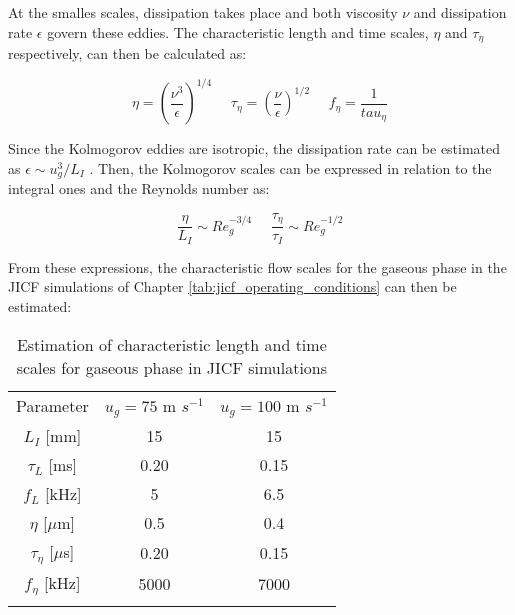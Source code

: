 At the smalles scales, dissipation takes place and both viscosity $\nu$ and dissipation rate $\epsilon$ govern these eddies. The characteristic length and time scales, $\eta$ and $\tau_\eta$ respectively, can then be calculated as:

\begin{equation}
\eta = \left( \frac{\nu^3}{\epsilon} \right)^{1/4} ~~~~~~ \tau_\eta = \left( \frac{\nu}{\epsilon} \right)^{1/2} ~~~~~~ f_\eta = \frac{1}{tau_\eta}
\end{equation}

Since the Kolmogorov eddies are isotropic, the dissipation rate can be estimated as $\epsilon \sim u_g^3/L_I$ . Then, the Kolmogorov scales can be expressed in relation to the integral ones and the Reynolds number as:

\begin{equation}
\frac{\eta}{L_I} \sim Re_g^{-3/4} ~~~~~~ \frac{\tau_\eta}{\tau_I} \sim Re_g^{-1/2}
\end{equation}

From these expressions, the characteristic flow scales for the gaseous phase in the JICF simulations of Chapter \ref{tab:jicf_operating_conditions} can then be estimated:

\begin{table}[!h]
\centering
\caption{Estimation of characteristic length and time scales for gaseous phase in JICF simulations}
\begin{tabular}{ccc}
\thickhline
Parameter &  $u_g = 75$ m $s^{-1}$ &  $u_g = 100$ m $s^{-1}$ \\ 
\thickhline
$L_I$ [mm] & 15 & 15 \\
$\tau_L$ [ms] & 0.20 & 0.15 \\
$f_L$ [kHz] & 5 & 6.5 \\
\thickhline
$\eta$ [$\mu$m] & 0.5 & 0.4 \\
$\tau_\eta$ [$\mu$s] & 0.20 & 0.15 \\
$f_\eta$ [kHz] & 5000 & 7000 \\
\thickhline
\end{tabular}
\label{tab:jicf_velocity_profiles_parameters}
\end{table}